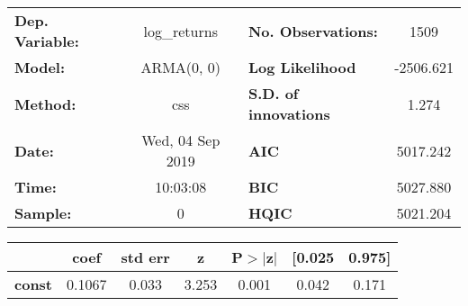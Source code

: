 \begin{center}
\begin{tabular}{lclc}
\toprule
\textbf{Dep. Variable:} &   log\_returns   & \textbf{  No. Observations:  } &    1509     \\
\textbf{Model:}         &    ARMA(0, 0)    & \textbf{  Log Likelihood     } & -2506.621   \\
\textbf{Method:}        &       css        & \textbf{  S.D. of innovations} &   1.274     \\
\textbf{Date:}          & Wed, 04 Sep 2019 & \textbf{  AIC                } &  5017.242   \\
\textbf{Time:}          &     10:03:08     & \textbf{  BIC                } &  5027.880   \\
\textbf{Sample:}        &        0         & \textbf{  HQIC               } &  5021.204   \\
\bottomrule
\end{tabular}
\begin{tabular}{lcccccc}
               & \textbf{coef} & \textbf{std err} & \textbf{z} & \textbf{P$> |$z$|$} & \textbf{[0.025} & \textbf{0.975]}  \\
\midrule
\textbf{const} &       0.1067  &        0.033     &     3.253  &         0.001        &        0.042    &        0.171     \\
\bottomrule
\end{tabular}
\end{center}
